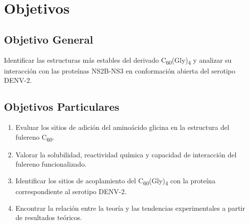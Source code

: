 \titleformat{\chapter}[display]
  {\normalfont\bfseries}{}{0pt}{\Large} %
\chapter{Objetivos}

\section{Objetivo General}
Identificar las estructuras más estables del derivado C\textsubscript{60}(Gly)\textsubscript{4} y analizar su interacción con las proteínas NS2B-NS3 en conformación abierta  del serotipo DENV-2.

\section{Objetivos Particulares}

\begin{enumerate}
    \item Evaluar los sitios de adición del aminoácido glicina en la estructura del fulereno C\textsubscript{60}.
    \item Valorar la solubilidad, reactividad química y capacidad de interacción del fulereno funcionalizado.
    \item Identificar los sitios de acoplamiento del C\textsubscript{60}(Gly)\textsubscript{4} con la proteína correspondiente al serotipo DENV-2.
    \item Encontrar la relación entre la teoría y las tendencias experimentales a partir de resultados teóricos.
\end{enumerate}

